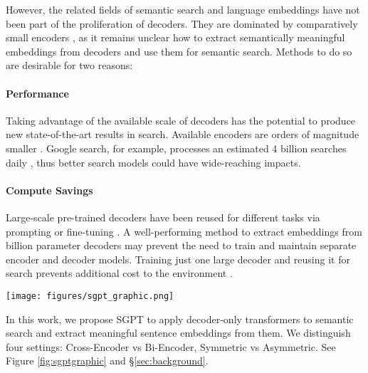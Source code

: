 \documentclass{article}
\begin{document}
However, the related fields of semantic search and language embeddings have not been part of the proliferation of decoders. They are dominated by comparatively small encoders \cite{thakur2021beir}, as it remains unclear how to extract semantically meaningful embeddings from decoders and use them for semantic search. Methods to do so are desirable for two reasons: 

\paragraph{Performance}
Taking advantage of the available scale of decoders has the potential to produce new state-of-the-art results in search. Available encoders are orders of magnitude smaller \cite{devlin2018bert, liu2019roberta, raffel2019exploring}. Google search, for example, processes an estimated 4 billion searches daily \cite{googlestats}, thus better search models could have wide-reaching impacts.

\paragraph{Compute Savings} 
Large-scale pre-trained decoders have been reused for different tasks via prompting or fine-tuning \cite{brown2020language, rae2021scaling, chowdhery2022palm}. A well-performing method to extract embeddings from billion parameter decoders may prevent the need to train and maintain separate encoder and decoder models. Training just one large decoder and reusing it for search prevents additional cost to the environment \cite{bommasani2021opportunities}.

\begin{figure*}[t]
    \centering
    \begin{center}
\texttt{[image: figures/sgpt\_graphic.png]}
        \caption{Given a query , documents , SGPT ranks the documents with scores . (a) The Cross-Encoder concatenates queries and documents and encodes them together. Scores are extracted log probabilities. (b) The Bi-Encoder separately encodes queries and documents. Resulting document vectors  can be cached and retrieved at time , when a new query comes in. Scores are cosine similarities.}
\label{fig:sgptgraphic}
    \end{center}
\end{figure*}

In this work, we propose SGPT to apply decoder-only transformers to semantic search and extract meaningful sentence embeddings from them. We distinguish four settings: Cross-Encoder vs Bi-Encoder, Symmetric vs Asymmetric. See Figure \ref{fig:sgptgraphic} and \S\ref{sec:background}.
\end{document}
